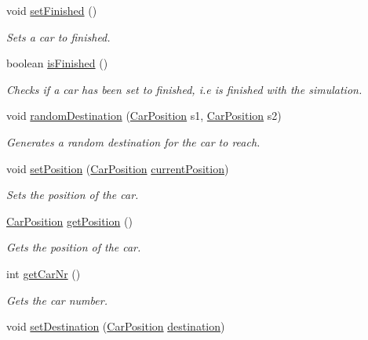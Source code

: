\begin{DoxyCompactItemize}
\item 
\hypertarget{class_car_ab6c6c319f2d635748b34c0e24596feca}{void \hyperlink{class_car_ab6c6c319f2d635748b34c0e24596feca}{set\+Finished} ()}\label{class_car_ab6c6c319f2d635748b34c0e24596feca}

\begin{DoxyCompactList}\small\item\em Sets a car to finished. \end{DoxyCompactList}\item 
boolean \hyperlink{class_car_ac66efad04dca42f1dac6f9d4421f283f}{is\+Finished} ()
\begin{DoxyCompactList}\small\item\em Checks if a car has been set to finished, i.\+e is finished with the simulation. \end{DoxyCompactList}\item 
void \hyperlink{class_car_a966437af777f1187194ffcca3a4707fd}{random\+Destination} (\hyperlink{class_car_position}{Car\+Position} s1, \hyperlink{class_car_position}{Car\+Position} s2)
\begin{DoxyCompactList}\small\item\em Generates a random destination for the car to reach. \end{DoxyCompactList}\item 
void \hyperlink{class_car_a82739f8a2cd5feb3d41fbb386ed4539a}{set\+Position} (\hyperlink{class_car_position}{Car\+Position} \hyperlink{class_car_aa2011891bfead81fe201257172843a95}{current\+Position})
\begin{DoxyCompactList}\small\item\em Sets the position of the car. \end{DoxyCompactList}\item 
\hyperlink{class_car_position}{Car\+Position} \hyperlink{class_car_ab3350ba59a2a0f54866dc525a5f3d453}{get\+Position} ()
\begin{DoxyCompactList}\small\item\em Gets the position of the car. \end{DoxyCompactList}\item 
int \hyperlink{class_car_aa576cf15525523b1fff309555bb091de}{get\+Car\+Nr} ()
\begin{DoxyCompactList}\small\item\em Gets the car number. \end{DoxyCompactList}\item 
void \hyperlink{class_car_a749a0f1dd5d45ade9997f9d349376df2}{set\+Destination} (\hyperlink{class_car_position}{Car\+Position} \hyperlink{class_car_a8ec85c8488be9a19f14077fb861b7753}{destination})

\end{DoxyCompactItemize}
